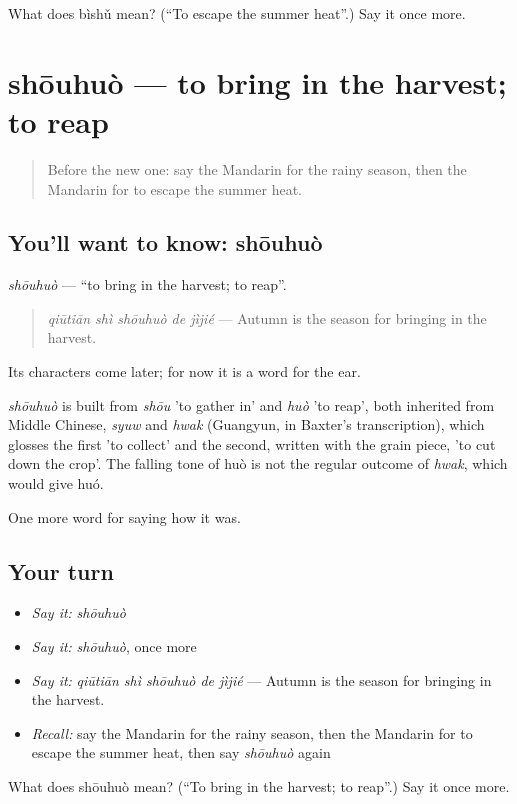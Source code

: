 \begin{tcolorbox}[breakable,colback=teal!4,colframe=teal!35!black,title={Before you move on}]
What does bìshǔ mean? (\textquotedblleft{}To escape the summer heat\textquotedblright{}.) Say it once more.
\end{tcolorbox}
\section[shōuhuò]{shōuhuò — to bring in the harvest; to reap}

\label{lesson:ZH-C515-shouhuo}



\begin{quote}
Before the new one: say the Mandarin for the rainy season, then the Mandarin for to escape the summer heat.
\end{quote}

\subsection*{You'll want to know: shōuhuò}
\emph{shōuhuò} — \textquotedblleft{}to bring in the harvest; to reap\textquotedblright{}.

\begin{quote}
\emph{qiūtiān shì shōuhuò de jìjié} — Autumn is the season for bringing in the harvest.
\end{quote}

Its characters come later; for now it is a word for the ear.

\begin{cousinweb}
\emph{shōuhuò} is built from \emph{shōu} 'to gather in' and \emph{huò} 'to reap', both inherited from Middle Chinese, \emph{syuw} and \emph{hwak} (Guangyun, in Baxter's transcription), which glosses the first 'to collect' and the second, written with the grain piece, 'to cut down the crop'. The falling tone of huò is not the regular outcome of \emph{hwak}, which would give huó.
\end{cousinweb}

\begin{grammarlens}[title={What you've built}]
One more word for saying how it was.
\end{grammarlens}

\subsection*{Your turn}
\begin{itemize}
\raggedright
  \item \emph{Say it:} \emph{shōuhuò}
  \item \emph{Say it:} \emph{shōuhuò}, once more
  \item \emph{Say it:} \emph{qiūtiān shì shōuhuò de jìjié} — Autumn is the season for bringing in the harvest.
  \item \emph{Recall:} say the Mandarin for the rainy season, then the Mandarin for to escape the summer heat, then say \emph{shōuhuò} again
\end{itemize}

\begin{tcolorbox}[breakable,colback=teal!4,colframe=teal!35!black,title={Before you move on}]
What does shōuhuò mean? (\textquotedblleft{}To bring in the harvest; to reap\textquotedblright{}.) Say it once more.
\end{tcolorbox}

